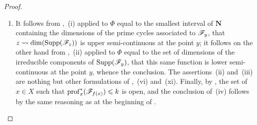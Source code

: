 \begin{proof}
\begin{enumerate}[label=(\roman*)]
  \item It follows from ,~(i) applied to $\Phi$ equal to the smallest interval of $\mathbf{N}$ containing the dimensions of the prime cycles associated to $\mathscr{F}_y$, that $z\leadsto\dim(\operatorname{Supp}(\mathscr{F}_z))$ is upper semi-continuous at the point $y$; it follows on the other hand from ,~(ii) applied to $\Phi$ equal to the set of dimensions of the irreducible components of $\operatorname{Supp}(\mathscr{F}_y)$, that this same function is lower semi-continuous at the point $y$, whence the conclusion.
The assertions~(ii) and~(iii) are nothing but other formulations of ,~(vi) and~(xi).
Finally, by , the set of $x\in X$ such that $\operatorname{prof}_x^*(\mathscr{F}_{f(x)})\leqslant k$ is open, and the conclusion of~(iv) follows by the same reasoning as at the beginning of .
\end{enumerate}
\end{proof}

